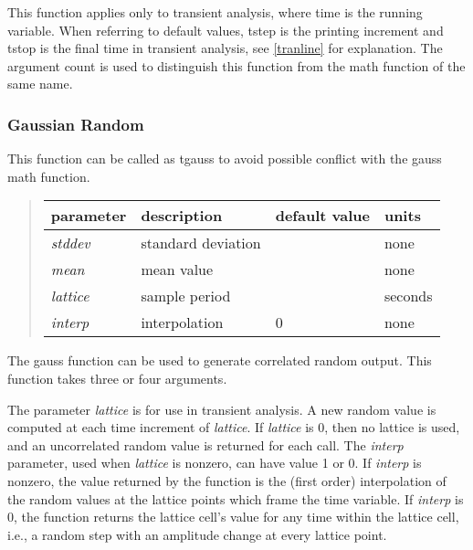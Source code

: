 This function applies only to transient analysis, where time is the
running variable.  When referring to default values, {\vt tstep} is
the printing increment and {\vt tstop} is the final time in transient
analysis, see \ref{tranline} for explanation.  The argument count is
used to distinguish this function from the math function of the same
name.

\subsubsection{Gaussian Random}
\label{tgauss}



This function can be called as {\vt tgauss} to avoid possible conflict
with the {\vt gauss} math function.

\begin{quote}
\begin{tabular}{|l|l|l|l|} \hline
{\bf parameter} & {\bf description} & {\bf default value} &
 {\bf units}\\ \hline\hline
{\it stddev\/} & standard deviation &  & none\\ \hline
{\it mean\/} & mean value &  & none\\ \hline
{\it lattice\/} & sample period &  & seconds\\ \hline
{\it interp\/} & interpolation & 0 & none\\ \hline
\end{tabular}
\end{quote}

The {\vt gauss} function can be used to generate correlated random
output.  This function takes three or four arguments.

The parameter {\it lattice} is for use in transient analysis.  A new
random value is computed at each time increment of {\it lattice}.  If
{\it lattice} is 0, then no lattice is used, and an uncorrelated
random value is returned for each call.  The {\it interp} parameter,
used when {\it lattice} is nonzero, can have value 1 or 0.  If {\it
interp} is nonzero, the value returned by the function is the (first
order) interpolation of the random values at the lattice points which
frame the time variable.  If {\it interp} is 0, the function returns
the lattice cell's value for any time within the lattice cell, i.e., a
random step with an amplitude change at every lattice point.


